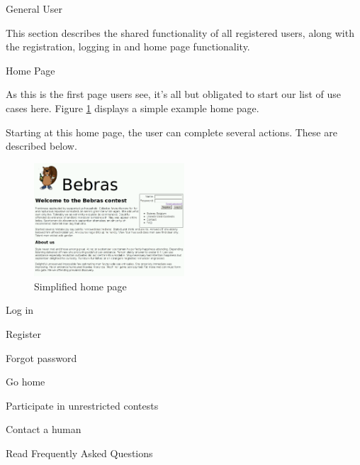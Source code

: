 
\begin{section}{General User}

    This section describes the shared functionality of all registered users,
    along with the registration, logging in and home page functionality.

    \begin{subsection}{Home Page}

        As this is the first page users see, it's all but obligated to start our
        list of use cases here. Figure \ref{img:index} displays a simple example
        home page.

        Starting at this home page, the user can complete several actions. These
        are described below.

        \begin{figure}[b]
            \centering
            \includegraphics[width=0.5\textwidth]{img/index.png}
            \caption{Simplified home page}
            \label{img:index}
        \end{figure}

        \begin{subsubsection}{Log in}
        \end{subsubsection}

        \begin{subsubsection}{Register}
        \end{subsubsection}

        \begin{subsubsection}{Forgot password}
        \end{subsubsection}

        \begin{subsubsection}{Go home}
        \end{subsubsection}

        \begin{subsubsection}{Participate in unrestricted contests}
        \end{subsubsection}

        \begin{subsubsection}{Contact a human}
        \end{subsubsection}

        \begin{subsubsection}{Read Frequently Asked Questions}
        \end{subsubsection}

    \end{subsection}

\end{section}


